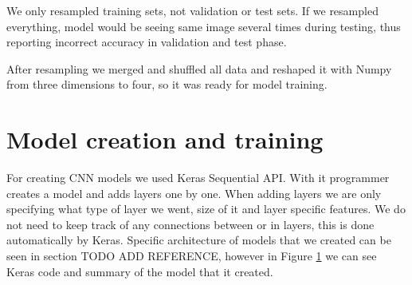 We only resampled training sets, not validation or test sets.
If we resampled everything, model would be seeing same image several times during testing, thus reporting incorrect accuracy in validation and test phase.

After resampling we merged and shuffled all data and reshaped it with Numpy from three dimensions to four, so it was ready for model training.


\section{ Model creation and training}

For creating CNN models we used Keras Sequential API. 
With it programmer creates a model and adds layers one by one.
When adding layers we are only specifying what type of layer we went, size of it and layer specific features. 
We do not need to keep track of any connections between or in layers, this is done automatically by Keras.
Specific architecture of models that we created can be seen in section TODO ADD REFERENCE, however in Figure \ref{} we can see Keras code and summary of the model that it created.



\lstset{style=mystyle}

